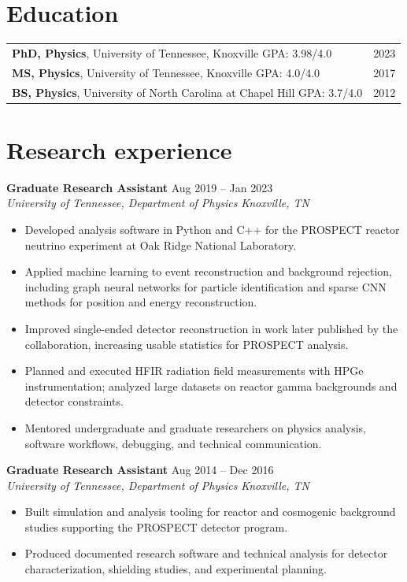 \documentclass[10pt,letterpaper]{article}
\newcommand{\role}[4]{%
  \textbf{#1} \hfill #2\\
  \textit{#3} \hfill \textit{#4}\\[-2pt]
}
\begin{document}
\section*{Education}
\begin{tabularx}{\textwidth}{@{}Xr@{}}
\textbf{PhD, Physics}, University of Tennessee, Knoxville \quad GPA: 3.98/4.0 & 2023\\
\textbf{MS, Physics}, University of Tennessee, Knoxville \quad GPA: 4.0/4.0 & 2017\\
\textbf{BS, Physics}, University of North Carolina at Chapel Hill \quad GPA: 3.7/4.0 & 2012\\
\end{tabularx}

\section*{Research experience}
\role{Graduate Research Assistant}{Aug 2019 -- Jan 2023}{University of Tennessee, Department of Physics}{Knoxville, TN}
\begin{itemize}
  \item Developed analysis software in Python and C++ for the PROSPECT reactor neutrino experiment at Oak Ridge National Laboratory.
  \item Applied machine learning to event reconstruction and background rejection, including graph neural networks for particle identification and sparse CNN methods for position and energy reconstruction.
  \item Improved single-ended detector reconstruction in work later published by the collaboration, increasing usable statistics for PROSPECT analysis.
  \item Planned and executed HFIR radiation field measurements with HPGe instrumentation; analyzed large datasets on reactor gamma backgrounds and detector constraints.
  \item Mentored undergraduate and graduate researchers on physics analysis, software workflows, debugging, and technical communication.
\end{itemize}

\role{Graduate Research Assistant}{Aug 2014 -- Dec 2016}{University of Tennessee, Department of Physics}{Knoxville, TN}
\begin{itemize}
  \item Built simulation and analysis tooling for reactor and cosmogenic background studies supporting the PROSPECT detector program.
  \item Produced documented research software and technical analysis for detector characterization, shielding studies, and experimental planning.
\end{itemize}
\end{document}
